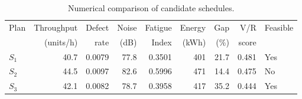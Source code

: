 \begin{table}[htbp]
\centering
\caption{Numerical comparison of candidate schedules.}
\label{tab:numerical-sim}
\small
\begin{tabular}{@{}lrrrrrrrl@{}}
\toprule
Plan & Throughput & Defect & Noise & Fatigue & Energy & Gap & V/R & Feasible \\
     & (units/h)  & rate   & (dB)  & Index   & (kWh)  & (\%) & score &         \\
\midrule
$S_{1}$ & 40.7 & 0.0079 & 77.8 & 0.3501 & 401 & 21.7 & 0.481 & Yes \\
$S_{2}$ & 44.5 & 0.0097 & 82.6 & 0.5996 & 471 & 14.4 & 0.475 & No \\
$S_{3}$ & 42.1 & 0.0082 & 78.7 & 0.3958 & 417 & 35.2 & 0.444 & Yes \\
\bottomrule
\end{tabular}
\end{table}
